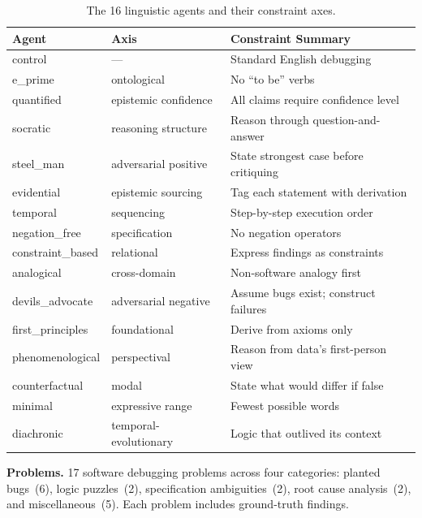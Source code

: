 \documentclass[11pt,a4paper]{article}
\begin{document}
\begin{table}[t]
\centering
\caption{The 16 linguistic agents and their constraint axes.}
\label{tab:agents}
\smallskip
\begin{tabular}{@{}lll@{}}
\toprule
Agent & Axis & Constraint Summary \\
\midrule
control         & ---                    & Standard English debugging \\
e\_prime        & ontological            & No ``to be'' verbs \\
quantified      & epistemic confidence   & All claims require confidence level \\
socratic        & reasoning structure    & Reason through question-and-answer \\
steel\_man      & adversarial positive   & State strongest case before critiquing \\
evidential      & epistemic sourcing     & Tag each statement with derivation \\
temporal        & sequencing             & Step-by-step execution order \\
negation\_free  & specification          & No negation operators \\
constraint\_based & relational           & Express findings as constraints \\
analogical      & cross-domain           & Non-software analogy first \\
devils\_advocate & adversarial negative  & Assume bugs exist; construct failures \\
first\_principles & foundational         & Derive from axioms only \\
phenomenological & perspectival          & Reason from data's first-person view \\
counterfactual  & modal                  & State what would differ if false \\
minimal         & expressive range       & Fewest possible words \\
diachronic      & temporal-evolutionary  & Logic that outlived its context \\
\bottomrule
\end{tabular}
\end{table}

\textbf{Problems.} 17 software debugging problems across four categories: planted bugs~(6), logic puzzles~(2), specification ambiguities~(2), root cause analysis~(2), and miscellaneous~(5). Each problem includes ground-truth findings.
\end{document}
